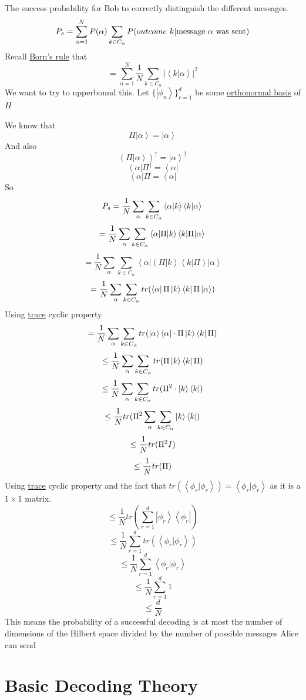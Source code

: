 \documentclass[
]{article}
\let\oldhyperref\hyperref
\renewcommand{\hyperref}[2][]{\oldhyperref[#1]{\underline{#2}}}
\providecommand{\ket}[1]{\left\lvert #1 \right\rangle}
\providecommand{\bra}[1]{\left\langle #1 \right\rvert}
\providecommand{\braket}[1]{\left\langle #1 \right\rangle}
\begin{document}
The success probability for Bob to correctly distinguish the different messages.
\[
	P_s=\sum_{\alpha=1}^NP(\alpha)\sum_{k\in C_\alpha}P(outcome~k|\text{message $\alpha$ was sent})\\
\]
Recall \hyperref[borns-rule]{Born's rule} that
\[
	=\sum_{\alpha =1}^N\frac{1}{N}\sum_{k\in C_\alpha}|\braket{k|\alpha}|^2
\]
We want to try to upperbound this. Let $\{\ket{\phi_n}\}_{r=1}^d$ be some \hyperref[orthonormality]{orthonormal basis} of $H$

We know that
\[
	\Pi\ket{\alpha}=\ket{\alpha}
\]
And also
\[
	(\Pi\ket{\alpha})^\dag=\ket{\alpha}^\dagger
\]
\[
	\bra{\alpha}\Pi^\dag=\bra{\alpha}
\]
\[
	\bra{\alpha}\Pi=\bra{\alpha}
\]
So
\[
	P_s=\frac{1}{N}\sum_\alpha\sum_{k\in C_\alpha}\braket{\alpha|k}\braket{k|\alpha}\\
\]
\[
	=\frac{1}{N}\sum_\alpha\sum_{k\in C_\alpha}\braket{\alpha|\Pi|k}\braket{k|\Pi|\alpha}\\
\]
\[
	=\frac{1}{N}\sum_\alpha\sum_{k\in C_\alpha}\bra{\alpha}(\Pi\ket{k}\bra{k}\Pi)\ket{\alpha}
\]
\[
	= \frac{1}{N}\sum_\alpha \sum_{k\in C_\alpha}tr(\bra{\alpha}\Pi\ket{k}\bra{k}\Pi\ket{\alpha})\\
\]
Using \hyperref[traces]{trace} cyclic property
\[
	= \frac{1}{N}\sum_\alpha \sum_{k\in C_\alpha}tr(\ket{\alpha}\bra{\alpha}\cdot \Pi\ket{k}\bra{k}\Pi)\\
\]
\[
	\leq \frac{1}{N}\sum_\alpha \sum_{k\in C_\alpha}tr(\Pi\ket{k}\bra{k}\Pi)\\
\]
\[
	\leq \frac{1}{N}\sum_\alpha \sum_{k\in C_\alpha}tr(\Pi^2\cdot\ket{k}\bra{k})\\
\]
\[
	\leq \frac{1}{N}tr(\Pi^2\sum_\alpha\sum_{k\in C_\alpha}\ket{k}\bra{k})\\
\]
\[
	\leq \frac{1}{N}tr(\Pi^2I)\\
\]
\[
	\leq\frac{1}{N}tr(\Pi)\\
\]
Using \hyperref[traces]{trace} cyclic property and the fact that \(tr(\braket{\phi_r|\phi_r})=\braket{\phi_r|\phi_r}\) as it is a \(1\times 1\) matrix.
\[
	\leq\frac{1}{N}tr(\sum_{r=1}^d\ket{\phi_r}\bra{\phi_r})
\]
\[
	\leq\frac{1}{N}\sum_{r=1}^dtr(\braket{\phi_r|\phi_r})
\]
\[
	\leq\frac{1}{N}\sum_{r=1}^d\braket{\phi_r|\phi_r}
\]
\[
	\leq\frac{1}{N}\sum_{r=1}^d1
\]
\[
	\leq\frac{d}{N}
\]
This means the probability of a successful decoding is at most the number of dimensions of the Hilbert space divided by the number of possible messages Alice can send

\section{Basic Decoding Theory}\label{basic-decoding-theory}
\end{document}
